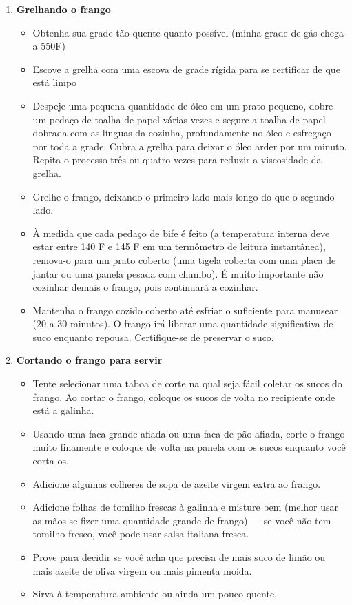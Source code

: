 \documentclass [11pt, letterpaper] {article}
\begin{document}
\begin {description}
\begin {enumerate}
\item {\bf Grelhando o frango}
\begin {itemize}
\item Obtenha sua grade tão quente quanto possível (minha grade de gás chega a 550F)
\item Escove a grelha com uma escova de grade rígida para se certificar de que está limpo
\item Despeje uma pequena quantidade de óleo em um prato pequeno, dobre um pedaço de toalha de papel várias vezes e segure a toalha de papel dobrada com as línguas da cozinha, profundamente no óleo e esfregaço por toda a grade. Cubra a grelha para deixar o óleo arder por um minuto. Repita o processo três ou quatro vezes para reduzir a viscosidade da grelha.
\item Grelhe o frango, deixando o primeiro lado mais longo do que o segundo lado.
\item À medida que cada pedaço de bife é feito (a temperatura interna deve estar entre 140 F e 145 F em um termômetro de leitura instantânea), remova-o para um prato coberto (uma tigela coberta com uma placa de jantar ou uma panela pesada com chumbo). É muito importante não cozinhar demais o frango, pois continuará a cozinhar.
\item Mantenha o frango cozido coberto até esfriar o suficiente para manusear (20 a 30 minutos). O frango irá liberar uma quantidade significativa de suco enquanto repousa. Certifique-se de preservar o suco.
\end {itemize}

\item {\bf Cortando o frango para servir}
\begin {itemize}
        \item Tente selecionar uma taboa de corte na qual seja fácil coletar os sucos do frango. Ao cortar o frango, coloque os sucos de volta no recipiente onde est\'a a galinha.
\item Usando uma faca grande afiada ou uma faca de pão afiada, corte o frango muito finamente e coloque de volta na panela com os sucos enquanto você corta-os.
\item Adicione algumas colheres de sopa de azeite virgem extra ao frango.
\item Adicione folhas de tomilho frescas  \`a galinha e misture bem (melhor usar as mãos se fizer uma quantidade grande de frango) --- se você não tem tomilho fresco, você pode usar salsa italiana fresca.
\item Prove para decidir se você acha que precisa de mais suco de limão ou mais azeite  de oliva virgem ou mais pimenta moída.
\item Sirva à temperatura ambiente ou ainda um pouco quente.
\end {itemize}
     \end {enumerate}
\end {description}
\end{document}

